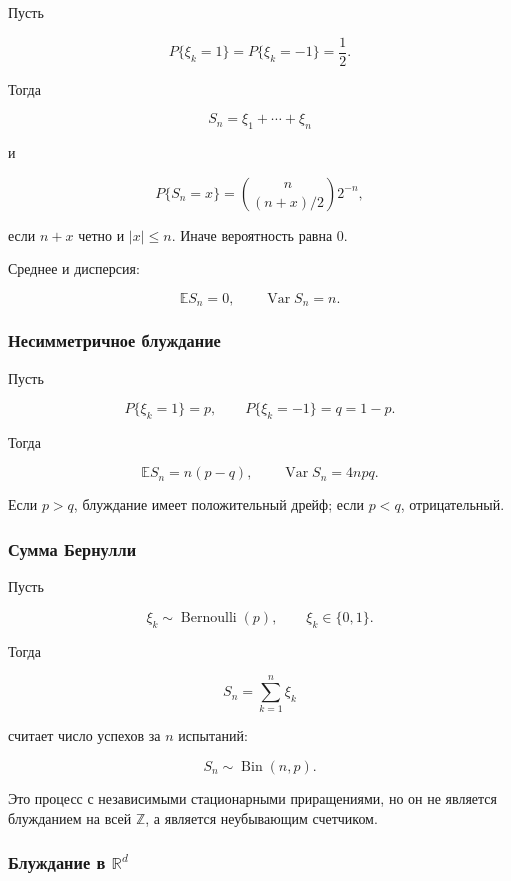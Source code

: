 \documentclass[
  11pt,
  a4paper,
]{article}
\begin{document}
Пусть

\[
P\{\xi_k=1\}=P\{\xi_k=-1\}=\frac12.
\]

Тогда

\[
S_n=\xi_1+\cdots+\xi_n
\]

и

\[
P\{S_n=x\}
=
\binom n{(n+x)/2}2^{-n},
\]

если \(n+x\) четно и \(|x|\le n\). Иначе вероятность равна \(0\).

Среднее и дисперсия:

\[
\mathbb ES_n=0,
\qquad
\operatorname{Var}S_n=n.
\]

\subsubsection{Несимметричное
блуждание}\label{ux43dux435ux441ux438ux43cux43cux435ux442ux440ux438ux447ux43dux43eux435-ux431ux43bux443ux436ux434ux430ux43dux438ux435}

Пусть

\[
P\{\xi_k=1\}=p,
\qquad
P\{\xi_k=-1\}=q=1-p.
\]

Тогда

\[
\mathbb ES_n=n(p-q),
\qquad
\operatorname{Var}S_n=4npq.
\]

Если \(p>q\), блуждание имеет положительный дрейф; если \(p<q\),
отрицательный.

\subsubsection{Сумма
Бернулли}\label{ux441ux443ux43cux43cux430-ux431ux435ux440ux43dux443ux43bux43bux438}

Пусть

\[
\xi_k\sim \operatorname{Bernoulli}(p),
\qquad
\xi_k\in\{0,1\}.
\]

Тогда

\[
S_n=\sum_{k=1}^n\xi_k
\]

считает число успехов за \(n\) испытаний:

\[
S_n\sim \operatorname{Bin}(n,p).
\]

Это процесс с независимыми стационарными приращениями, но он не является
блужданием на всей \(\mathbb Z\), а является неубывающим счетчиком.

\subsubsection{\texorpdfstring{Блуждание в
\(\mathbb R^d\)}{Блуждание в \textbackslash mathbb R\^{}d}}\label{ux431ux43bux443ux436ux434ux430ux43dux438ux435-ux432-mathbb-rd}
\end{document}
